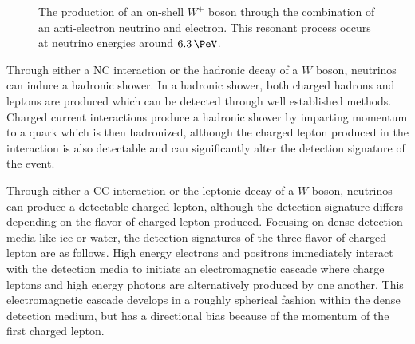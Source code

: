 \begin{figure}
	\centering
	\caption{The production of an on-shell $W^+$ boson through the combination of an anti-electron neutrino and electron.
	This resonant process occurs at neutrino energies around $\SI{6.3}\PeV$.}
	\label{fig:glashow}
\end{figure}

Through either a NC interaction or the hadronic decay of a $W$ boson, neutrinos can induce a hadronic shower.
In a hadronic shower, both charged hadrons and leptons are produced which can be detected through well established methods.
Charged current interactions produce a hadronic shower by imparting momentum to a quark which is then hadronized, although the charged lepton produced in the interaction is also detectable and can significantly alter the detection signature of the event.

Through either a CC interaction or the leptonic decay of a $W$ boson, neutrinos can produce a detectable charged lepton, although the detection signature differs depending on the flavor of charged lepton produced.
Focusing on dense detection media like ice or water, the detection signatures of the three flavor of charged lepton are as follows.
High energy electrons and positrons immediately interact with the detection media to initiate an electromagnetic cascade where charge leptons and high energy photons are alternatively produced by one another.
This electromagnetic cascade develops in a roughly spherical fashion within the dense detection medium, but has a directional bias because of the momentum of the first charged lepton.

